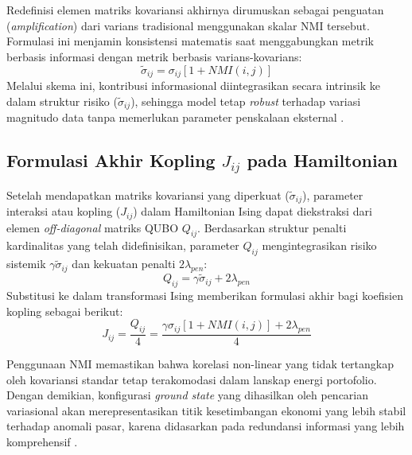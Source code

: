 Redefinisi elemen matriks kovariansi akhirnya dirumuskan sebagai penguatan (\textit{amplification}) dari varians tradisional menggunakan skalar NMI tersebut. Formulasi ini menjamin konsistensi matematis saat menggabungkan metrik berbasis informasi dengan metrik berbasis varians-kovarians:
\begin{equation}
\tilde{\sigma}_{ij} = \sigma_{ij} [1 + NMI(i, j)]
\label{eq:amplified_covariance}
\end{equation}
Melalui skema ini, kontribusi informasional diintegrasikan secara intrinsik ke dalam struktur risiko ($\tilde{\sigma}_{ij}$), sehingga model tetap \textit{robust} terhadap variasi magnitudo data tanpa memerlukan parameter penskalaan eksternal \cite{shannon_mathematical_1948}.

\subsection{Formulasi Akhir Kopling $J_{ij}$ pada Hamiltonian}

Setelah mendapatkan matriks kovariansi yang diperkuat ($\tilde{\sigma}_{ij}$), parameter interaksi atau kopling ($J_{ij}$) dalam Hamiltonian Ising dapat diekstraksi dari elemen \textit{off-diagonal} matriks QUBO $Q_{ij}$. Berdasarkan struktur penalti kardinalitas yang telah didefinisikan, parameter $Q_{ij}$ mengintegrasikan risiko sistemik $\gamma \tilde{\sigma}_{ij}$ dan kekuatan penalti $2\lambda_{pen}$:
\begin{equation}
Q_{ij} = \gamma \tilde{\sigma}_{ij} + 2\lambda_{pen}
\label{eq:final_qubo_coupling}
\end{equation}
Substitusi ke dalam transformasi Ising memberikan formulasi akhir bagi koefisien kopling sebagai berikut:
\begin{equation}
J_{ij} = \frac{Q_{ij}}{4} = \frac{\gamma \sigma_{ij} [1 + NMI(i, j)] + 2\lambda_{pen}}{4}
\label{eq:final_ising_coupling_jij}
\end{equation}

Penggunaan NMI memastikan bahwa korelasi non-linear yang tidak tertangkap oleh kovariansi standar tetap terakomodasi dalam lanskap energi portofolio. Dengan demikian, konfigurasi \textit{ground state} yang dihasilkan oleh pencarian variasional akan merepresentasikan titik kesetimbangan ekonomi yang lebih stabil terhadap anomali pasar, karena didasarkan pada redundansi informasi yang lebih komprehensif \cite{wang_achieving_2025}.

